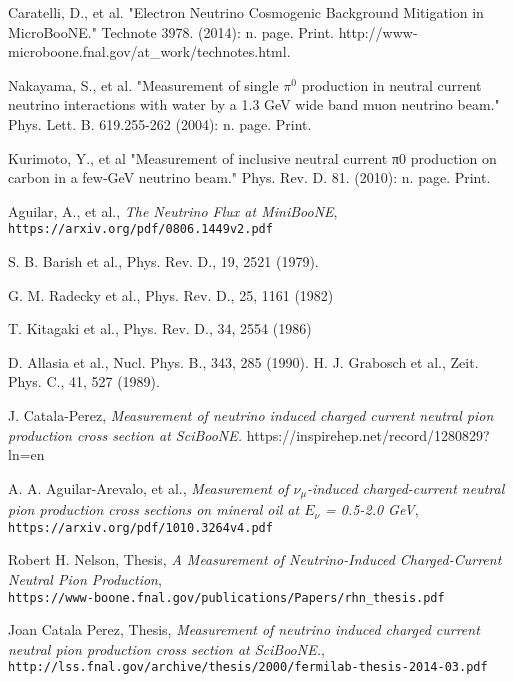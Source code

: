 \documentclass[12pt]{article}
\begin{document}
\begin{thebibliography}{20}
Caratelli, D., et al. "Electron Neutrino Cosmogenic Background Mitigation in MicroBooNE." Technote 3978. (2014): n. page. Print. http://www-microboone.fnal.gov/at\_work/technotes.html.

Nakayama, S., et al. "Measurement of single $\pi^0$ production in neutral current neutrino interactions with water by a 1.3 GeV wide band muon neutrino beam." Phys. Lett. B. 619.255-262 (2004): n. page. Print.

Kurimoto, Y., et al "Measurement of inclusive neutral current π0 production on carbon in a few-GeV neutrino beam." Phys. Rev. D. 81. (2010): n. page. Print.

  Aguilar, A., et al., \emph{The Neutrino Flux at MiniBooNE},\\
    \texttt{https://arxiv.org/pdf/0806.1449v2.pdf}

  S. B. Barish et al., Phys. Rev. D., 19, 2521 (1979).

 G. M. Radecky et al., Phys. Rev. D., 25, 1161 (1982)
 
 T. Kitagaki et al., Phys. Rev. D., 34, 2554 (1986)
 
 D. Allasia et al., Nucl. Phys. B., 343, 285 (1990).
 H. J. Grabosch et al., Zeit. Phys. C., 41, 527 (1989).

J. Catala-Perez, \emph{Measurement of neutrino induced charged current neutral pion production cross section at SciBooNE.}
https://inspirehep.net/record/1280829?ln=en

  A. A. Aguilar-Arevalo, et al., \emph{Measurement of $\nu_\mu$-induced charged-current neutral pion production cross sections on mineral oil at $E_\nu$ = 0.5-2.0 GeV},\\
  \texttt{https://arxiv.org/pdf/1010.3264v4.pdf}

  Robert H. Nelson, Thesis, \emph{A Measurement of Neutrino-Induced Charged-Current Neutral Pion Production},\\
  \texttt{https://www-boone.fnal.gov/publications/Papers/rhn\_thesis.pdf}
  
  Joan Catala Perez, Thesis, \emph{Measurement of neutrino induced charged current neutral pion production cross section at SciBooNE.},\\
  \texttt{http://lss.fnal.gov/archive/thesis/2000/fermilab-thesis-2014-03.pdf}  


\end{thebibliography}
\end{document}
